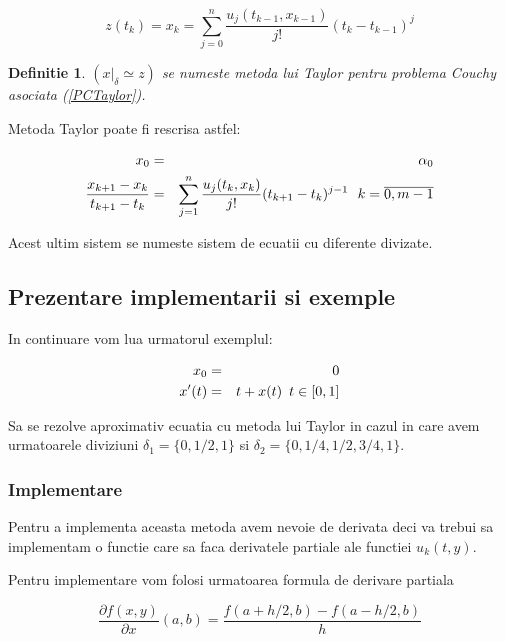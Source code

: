 \documentclass[a4paper,twoside]{book}
\newtheorem{definition}[theorem]{Definitie}
\begin{document}
\begin{equation*}
z(t_{k})=x_{k}=\sum_{j=0}^{n}\frac{u_{j}(t_{k-1},x_{k-1})}{j!}%
(t_{k}-t_{k-1})^{j}
\end{equation*}

\begin{definition}
$(x|_{\delta }\simeq z)$ se numeste metoda lui Taylor pentru problema Couchy
asociata (\ref{PCTaylor}).
\end{definition}

Metoda Taylor poate fi rescrisa astfel:

\begin{eqnarray}
x_{0} &=&\alpha _{0}  \label{difdiv} \\
\frac{x_{k+1}-x_{k}}{t_{k+1}-t_{k}} &=&\sum_{j=1}^{n}\frac{u_{j}(t_{k},x_{k})%
}{j!}(t_{k+1}-t_{k})^{j-1}\,\,\text{\thinspace \thinspace }k=\overline{0,m-1}
\notag
\end{eqnarray}

Acest ultim sistem se numeste sistem de ecuatii cu diferente divizate.

\subsection{Prezentare implementarii si exemple}

In continuare vom lua urmatorul exemplul:

\begin{eqnarray*}
x_{0} &=&0 \\
x^{\prime }(t) &=&t+x(t)\text{\thinspace \thinspace \thinspace }t\in \lbrack
0,1]
\end{eqnarray*}

Sa se rezolve aproximativ ecuatia cu metoda lui Taylor in cazul in care avem
urmatoarele diviziuni $\delta _{1}=\{0,1/2,1\}$ si $\delta
_{2}=\{0,1/4,1/2,3/4,1\}$.

\subsubsection{Implementare}

Pentru a implementa aceasta metoda avem nevoie de derivata deci va trebui sa
implementam o functie care sa faca derivatele partiale ale functiei $%
u_{k}(t,y)$.

Pentru implementare vom folosi urmatoarea formula de derivare partiala

\begin{equation*}
\frac{\partial f(x,y)}{\partial x}(a,b)=\frac{f(a+h/2,b)-f(a-h/2,b)}{h}
\end{equation*}
\end{document}
